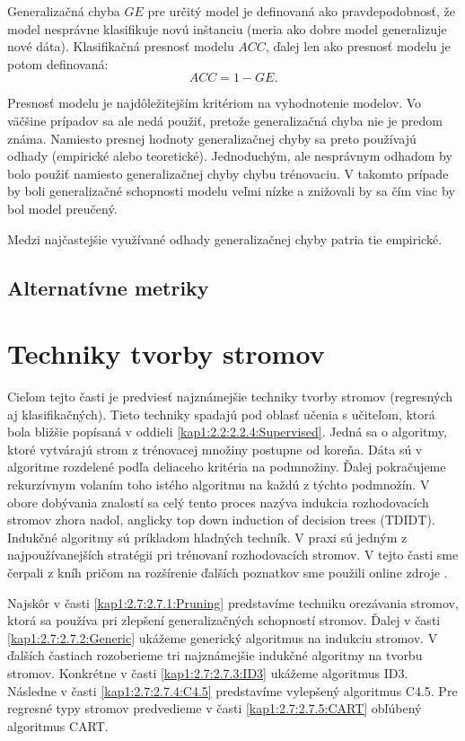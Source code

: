 Generalizačná chyba $GE$ pre určitý model je definovaná ako pravdepodobnosť, že model nesprávne klasifikuje novú inštanciu (meria ako dobre model generalizuje nové dáta). Klasifikačná presnosť modelu $ACC$, ďalej len ako presnosť modelu je potom definovaná:
\begin{equation}
ACC = 1 - GE.
\end{equation}

Presnosť modelu je najdôležitejším kritériom na vyhodnotenie modelov. Vo väčšine prípadov sa ale nedá použiť, pretože generalizačná chyba nie je predom známa. Namiesto presnej hodnoty generalizačnej chyby sa preto používajú odhady (empirické alebo teoretické). Jednoduchým, ale nesprávnym odhadom by bolo použiť namiesto generalizačnej chyby chybu trénovaciu. V takomto prípade by boli generalizačné schopnosti modelu veľmi nízke a znižovali by sa čím viac by bol model preučený.

Medzi najčastejšie využívané odhady generalizačnej chyby patria tie empirické.
\subsection{Alternatívne metriky}\label{kap1:2.6:2.6.2:Alternatives}

\section{Techniky tvorby stromov}\label{kap1:2.7:DTTechniques}
Cieľom tejto časti je predviesť najznámejšie techniky tvorby stromov (regresných aj klasifikačných). Tieto techniky spadajú pod oblasť učenia s učiteľom, ktorá bola bližšie popísaná v oddieli \ref{kap1:2.2:2.2.4:Supervised}. Jedná sa o algoritmy, ktoré vytvárajú strom z trénovacej množiny postupne od koreňa. Dáta sú v algoritme rozdelené podľa deliaceho kritéria na podmnožiny. Ďalej pokračujeme rekurzívnym volaním toho istého algoritmu na každú z týchto podmnožín. V obore dobývania znalostí sa celý tento proces nazýva indukcia rozhodovacích stromov zhora nadol, anglicky top down induction of decision trees (TDIDT). Indukčné algoritmy sú príkladom hladných techník. V praxi sú jedným z najpoužívanejších stratégii pri trénovaní rozhodovacích stromov. V tejto časti sme čerpali z kníh \cite{kap1-DataMiningForTrees,kap1-DataMiningAndAnalysis} pričom na rozšírenie ďalších poznatkov sme použili online zdroje \cite{online-SplitCriterias,online-SplitCriteriasMatter,online-DTLectures}.

Najskôr v časti \ref{kap1:2.7:2.7.1:Pruning} predstavíme techniku orezávania stromov, ktorá sa používa pri zlepšení generalizačných schopností stromov. Ďalej v časti \ref{kap1:2.7:2.7.2:Generic} ukážeme generický algoritmus na indukciu stromov. V ďalších častiach rozoberieme tri najznámejšie indukčné algoritmy na tvorbu stromov. Konkrétne v časti \ref{kap1:2.7:2.7.3:ID3} ukážeme algoritmus ID3. Následne v časti \ref{kap1:2.7:2.7.4:C4.5} predstavíme vylepšený algoritmus C4.5. Pre regresné typy stromov predvedieme v časti \ref{kap1:2.7:2.7.5:CART} obľúbený algoritmus CART.

